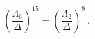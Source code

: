 \begin{equation}
\left(\frac{\Lambda_6}{\Delta}\right)^{15}=
\left(\frac{\Lambda_2}{\Delta} \right)^9 \ .
\end{equation}

